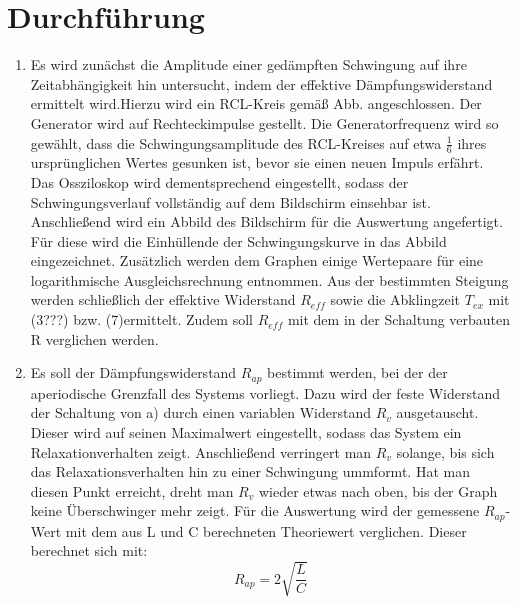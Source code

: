 \section{Durchführung}
\label{sec:Durchführung}
\renewcommand{\labelenumi}{\alph{enumi})}
\begin{enumerate}
\item Es wird zunächst die Amplitude einer gedämpften Schwingung auf ihre Zeitabhängigkeit hin untersucht, indem
 der effektive Dämpfungswiderstand ermittelt wird.Hierzu wird ein RCL-Kreis gemäß
 Abb.  angeschlossen. Der Generator wird auf Rechteckimpulse gestellt.
  Die Generatorfrequenz wird so gewählt, dass die Schwingungsamplitude des RCL-Kreises auf etwa $\frac{1}{6}$
   ihres ursprünglichen Wertes gesunken ist, bevor sie einen neuen Impuls erfährt. Das Ossziloskop
    wird dementsprechend eingestellt, sodass der Schwingungsverlauf vollständig auf dem Bildschirm einsehbar ist.
    Anschließend wird ein Abbild des Bildschirm für die Auswertung angefertigt.
    Für diese wird die Einhüllende der Schwingungskurve in das Abbild eingezeichnet.
     Zusätzlich werden dem Graphen einige Wertepaare für eine logarithmische Ausgleichsrechnung entnommen.
      Aus der bestimmten Steigung werden schließlich der effektive Widerstand $R_{eff}$ sowie die Abklingzeit $T_{ex}$  mit (3???) bzw. (7)ermittelt.
       Zudem soll $R_{eff}$ mit dem in der Schaltung verbauten R verglichen werden.

     \item Es soll der Dämpfungswiderstand $R_{ap}$ bestimmt werden, bei der der aperiodische Grenzfall des Systems vorliegt.
     Dazu wird der feste Widerstand der Schaltung von a) durch einen variablen Widerstand $R_v$
     ausgetauscht. Dieser wird auf seinen Maximalwert eingestellt, sodass das System ein Relaxationverhalten zeigt.
      Anschließend verringert man $R_v$ solange, bis sich das Relaxationsverhalten hin zu einer Schwingung ummformt.
      Hat man diesen Punkt erreicht, dreht man $R_v$ wieder etwas nach oben, bis der Graph keine Überschwinger mehr zeigt.
      Für die Auswertung wird der gemessene $R_{ap}$-Wert mit dem aus L und C berechneten Theoriewert verglichen.
       Dieser berechnet sich mit:
       \begin{equation}
         R_{ap} = 2\sqrt{\frac{L}{C}}
       \end{equation}


\end{enumerate}
